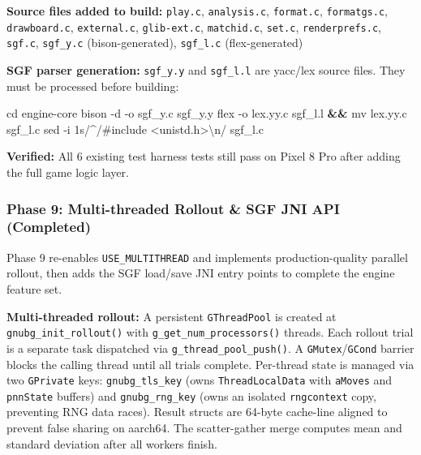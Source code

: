 \documentclass[11pt,a4paper]{article}
\newenvironment{Shaded}{%
  \setlength{\FrameSep}{4pt}%
  \definecolor{shadecolor}{RGB}{245,245,245}%
  \begin{snugshade}\footnotesize
}{\end{snugshade}}
\newcommand{\AttributeTok}[1]{\textcolor[rgb]{0.13,0.29,0.53}{#1}}
\newcommand{\BuiltInTok}[1]{#1}
\newcommand{\FunctionTok}[1]{\textcolor[rgb]{0.13,0.29,0.53}{#1}}
\newcommand{\KeywordTok}[1]{\textcolor[rgb]{0.13,0.29,0.53}{\textbf{#1}}}
\newcommand{\NormalTok}[1]{#1}
\newcommand{\StringTok}[1]{\textcolor[rgb]{0.31,0.60,0.02}{#1}}
\begin{document}
\textbf{Source files added to build:} \texttt{play.c},
\texttt{analysis.c}, \texttt{format.c}, \texttt{formatgs.c},
\texttt{drawboard.c}, \texttt{external.c}, \texttt{glib-ext.c},
\texttt{matchid.c}, \texttt{set.c}, \texttt{renderprefs.c},
\texttt{sgf.c}, \texttt{sgf\_y.c} (bison-generated), \texttt{sgf\_l.c}
(flex-generated)

\textbf{SGF parser generation:} \texttt{sgf\_y.y} and \texttt{sgf\_l.l}
are yacc/lex source files. They must be processed before building:

\begin{Shaded}
\begin{Highlighting}[]
\BuiltInTok{cd}\NormalTok{ engine{-}core}
\FunctionTok{bison} \AttributeTok{{-}d} \AttributeTok{{-}o}\NormalTok{ sgf\_y.c sgf\_y.y}
\FunctionTok{flex} \AttributeTok{{-}o}\NormalTok{ lex.yy.c sgf\_l.l }\KeywordTok{\&\&} \FunctionTok{mv}\NormalTok{ lex.yy.c sgf\_l.c}
\FunctionTok{sed} \AttributeTok{{-}i} \StringTok{\textquotesingle{}1s/\^{}/\#include \textless{}unistd.h\textgreater{}\textbackslash{}n/\textquotesingle{}}\NormalTok{ sgf\_l.c}
\end{Highlighting}
\end{Shaded}

\textbf{Verified:} All 6 existing test harness tests still pass on Pixel
8 Pro after adding the full game logic layer.

\subsubsection{Phase 9: Multi-threaded Rollout \& SGF JNI API
(Completed)}\label{phase-9-multi-threaded-rollout-sgf-jni-api-completed}

Phase 9 re-enables \texttt{USE\_MULTITHREAD} and implements
production-quality parallel rollout, then adds the SGF load/save JNI
entry points to complete the engine feature set.

\textbf{Multi-threaded rollout:} A persistent \texttt{GThreadPool} is
created at \texttt{gnubg\_init\_rollout()} with
\texttt{g\_get\_num\_processors()} threads. Each rollout trial is a
separate task dispatched via \texttt{g\_thread\_pool\_push()}. A
\texttt{GMutex}/\texttt{GCond} barrier blocks the calling thread until
all trials complete. Per-thread state is managed via two
\texttt{GPrivate} keys: \texttt{gnubg\_tls\_key} (owns
\texttt{ThreadLocalData} with \texttt{aMoves} and \texttt{pnnState}
buffers) and \texttt{gnubg\_rng\_key} (owns an isolated
\texttt{rngcontext} copy, preventing RNG data races). Result structs are
64-byte cache-line aligned to prevent false sharing on aarch64. The
scatter-gather merge computes mean and standard deviation after all
workers finish.
\end{document}
